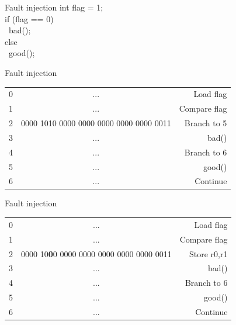 \documentclass[table]{beamer}
\begin{document}
\begin{frame}{Fault injection}
    int flag = 1; \\
    if (flag == 0) \\
    \     bad(); \\
    else \\
    \     good(); 
\end{frame}

\begin{frame}{Fault injection}
    \begin{table}[H]
          \begin{tabular}{l c r}
          0 & ... & Load flag \\
          1 & ... & Compare flag \\
          2 & 0000 1010 0000 0000 0000 0000 0000 0011 & Branch to 5 \\
          3 & ... & bad() \\
          4 & ... & Branch to 6 \\
          5 & ... & good() \\
          6 & ... & Continue \\
          \end{tabular}
    \end{table}
\end{frame}

\begin{frame}{Fault injection}
    \begin{table}[H]
          \begin{tabular}{l c r}
          0 & ... & Load flag \\
          1 & ... & Compare flag \\
          2 & 0000 10\textbf{0}0 0000 0000 0000 0000 0000 0011 &Store r0,r1  \\
          3 & ... & bad() \\
          4 & ... & Branch to 6 \\
          5 & ... & good() \\
          6 & ... & Continue \\
          \end{tabular}
    \end{table}
\end{frame}
\end{document}
